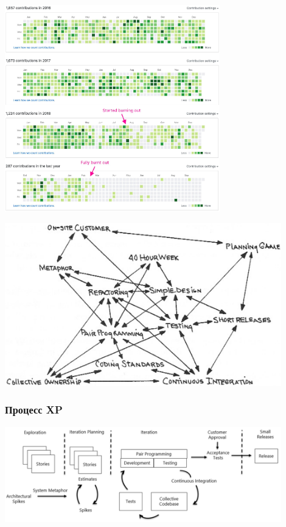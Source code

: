 \documentclass{../../slides-style}
\begin{document}
    \begin{frame}
        \begin{center}
            \includegraphics[width=0.7\textwidth]{burnout.png}
        \end{center}
    \end{frame}

    \begin{frame}
        \begin{center}
            \includegraphics[width=0.9\textwidth]{xpPracticesRelationship.png}
        \end{center}
    \end{frame}

    \begin{frame}
        \frametitle{Процесс XP}
        \begin{center}
            \includegraphics[width=0.9\textwidth]{xpProcess.png}
        \end{center}
    \end{frame}
\end{document}

